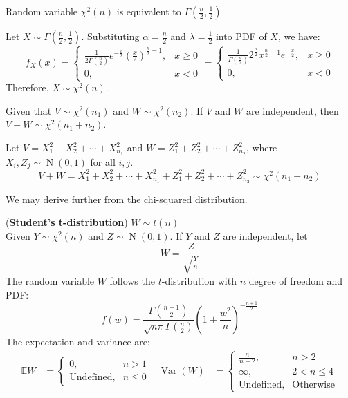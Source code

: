 \documentclass{huhtakm-template-book}
\newcommand{\expect}{\mathbb{E}}
\DeclareMathOperator{\N}{N}
\DeclareMathOperator{\Var}{Var}
\begin{document}
\newpage
\begin{lem}
	Random variable $\chi^{2}(n)$ is equivalent to $\Gamma(\frac{n}{2},\frac{1}{2})$.
\end{lem}
\begin{proofing}
	Let $X\sim\Gamma(\frac{n}{2},\frac{1}{2})$. Substituting $\alpha=\frac{n}{2}$ and $\lambda=\frac{1}{2}$ into PDF of $X$, we have:
	\begin{equation*}
		f_{X}(x)=\begin{cases}
			\frac{1}{2\Gamma(\frac{n}{2})}e^{-\frac{x}{2}}\left(\frac{x}{2}\right)^{\frac{n}{2}-1}, &x\geq 0\\
			0, &x<0
		\end{cases}=\begin{cases}
		\frac{1}{\Gamma(\frac{n}{2})}2^{\frac{n}{2}}x^{\frac{n}{2}-1}e^{-\frac{x}{2}}, &x\geq 0\\
		0, &x<0
		\end{cases}
	\end{equation*}
	Therefore, $X\sim\chi^{2}(n)$.
\end{proofing}
\begin{lem}
	\label{Chapter 5 (Lemma) Additivity of chi-squared distribution}
	Given that $V\sim\chi^{2}(n_{1})$ and $W\sim\chi^{2}(n_{2})$. If $V$ and $W$ are independent, then $V+W\sim\chi^{2}(n_{1}+n_{2})$.
\end{lem}
\begin{proofing}
	Let $V=X_{1}^{2}+X_{2}^{2}+\cdots+X_{n_{1}}^{2}$ and $W=Z_{1}^{2}+Z_{2}^{2}+\cdots+Z_{n_{2}}^{2}$, where $X_{i},Z_{j}\sim\N(0,1)$ for all $i,j$.
	\begin{equation*}
		V+W=X_{1}^{2}+X_{2}^{2}+\cdots+X_{n_{1}}^{2}+Z_{1}^{2}+Z_{2}^{2}+\cdots+Z_{n_{2}}^{2}\sim\chi^{2}(n_{1}+n_{2})
	\end{equation*}
\end{proofing}
We may derive further from the chi-squared distribution.
\begin{eg}(\textbf{Student's t-distribution}) $W\sim t(n)$\\
	Given $Y\sim\chi^{2}(n)$ and $Z\sim\N(0,1)$. If $Y$ and $Z$ are independent, let
	\begin{equation*}
		W=\frac{Z}{\sqrt{\frac{Y}{n}}}
	\end{equation*}
	The random variable $W$ follows the $t$-distribution with $n$ degree of freedom and PDF:
	\begin{equation*}
		f(w)=\frac{\Gamma\left(\frac{n+1}{2}\right)}{\sqrt{n\pi}\Gamma\left(\frac{n}{2}\right)}\left(1+\frac{w^{2}}{n}\right)^{-\frac{n+1}{2}}
	\end{equation*}
	The expectation and variance are:
	\begin{align*}
		\expect{W}&=\begin{cases}
			0, &n>1\\
			\text{Undefined}, &n\leq 0
		\end{cases} & \Var(W)&=\begin{cases}
			\frac{n}{n-2}, &n>2\\
			\infty, &2<n\leq 4\\
			\text{Undefined}, &\text{Otherwise}
		\end{cases}
	\end{align*}
\end{eg}
\end{document}
